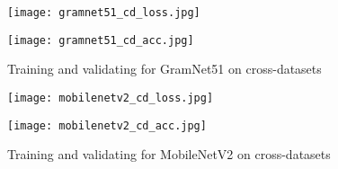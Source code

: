 \documentclass[rebuttal]{cvpr}
\begin{document}
\begin{figure*}[t]
\centering
\begin{minipage}{0.45\linewidth}
   \texttt{[image: gramnet51\_cd\_loss.jpg]}
   \label{fig:image1}
\end{minipage}
\hfill
\begin{minipage}{0.45\linewidth}
   \texttt{[image: gramnet51\_cd\_acc.jpg]}
   \label{fig:image2}
\end{minipage}
\caption{Training and validating for GramNet51 on cross-datasets}
\label{fig:gramnet51_cd}
\end{figure*}



\begin{figure*}[t]
\centering
\begin{minipage}{0.45\linewidth}
   \texttt{[image: mobilenetv2\_cd\_loss.jpg]}
   \label{fig:image1}
\end{minipage}
\hfill
\begin{minipage}{0.45\linewidth}
   \texttt{[image: mobilenetv2\_cd\_acc.jpg]}
   \label{fig:image2}
\end{minipage}
\caption{Training and validating for MobileNetV2 on cross-datasets}
\label{fig:mobilenetv2_cd}
\end{figure*}
\end{document}
